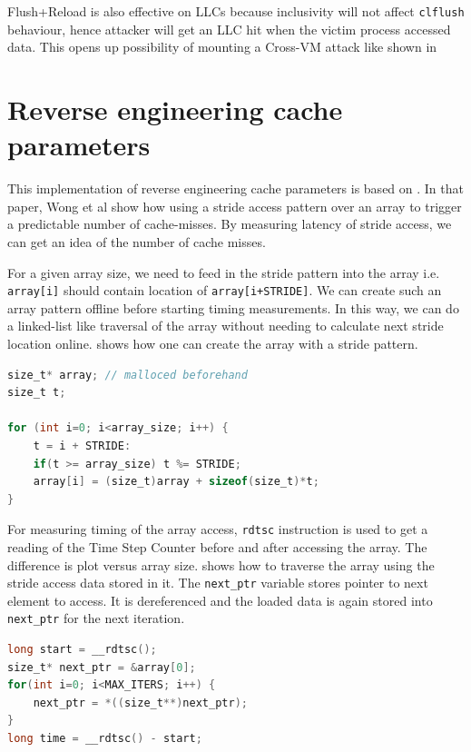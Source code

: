 Flush+Reload is also effective on LLCs because inclusivity will not affect
\texttt{clflush} behaviour, hence attacker will get an LLC hit when the victim
process accessed data. This opens up possibility of mounting a Cross-VM attack
 like shown in 

\section{Reverse engineering cache parameters}

This implementation of reverse engineering cache parameters is based on
. In that paper, Wong et al show how using a stride
access pattern over an array to trigger a predictable number of cache-misses.
By measuring latency of stride access, we can get an idea of the number of cache misses.

For a given array size, we need to feed in the stride pattern into the array
i.e. \texttt{array[i]} should contain location of \texttt{array[i+STRIDE]}. We can create such an
array pattern offline before starting timing measurements. In this way, we can
do a linked-list like traversal of the array without needing to calculate next
stride location online.  shows how one can create the
array with a stride pattern.

\begin{lstlisting}[label={lst:offline},caption={Offline
formation of array with stride access pattern},language={C}]
size_t* array; // malloced beforehand
size_t t;

for (int i=0; i<array_size; i++) {
    t = i + STRIDE:
    if(t >= array_size) t %= STRIDE;
    array[i] = (size_t)array + sizeof(size_t)*t;
}
\end{lstlisting}

For measuring timing of the array access, \texttt{rdtsc} instruction is used
to get a reading of the Time Step Counter before and after accessing the
array. The difference is plot versus array size. 
shows how to traverse the array using the stride access data stored in it. The
\texttt{next\_ptr} variable stores pointer to next element to access. It is
dereferenced and the loaded data is again stored into \texttt{next\_ptr} for
the next iteration.

\begin{lstlisting}[label={lst:array_access},caption={Timing measurement of stride access over the entire array},language={C}]
long start = __rdtsc();
size_t* next_ptr = &array[0];
for(int i=0; i<MAX_ITERS; i++) {
    next_ptr = *((size_t**)next_ptr);
}
long time = __rdtsc() - start;
\end{lstlisting}

